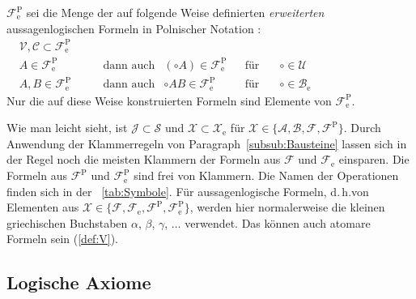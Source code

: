 \documentclass[english,ngerman,parskip=half,headsepline,footsepline,
	fleqn,notitlepage]{scrreprt}
\makeatletter
\newcommand*{\ase}{_\mathrm{e}}%
\newcommand*{\asp}{^\mathrm{P}}%
\newcommand*{\aspe}{\asp\ase}%
\newcommand*{\asA}{\mathcal{A}}%
\newcommand*{\asB}{\mathcal{B}}%
\newcommand*{\asC}{\mathcal{C}}%
\newcommand*{\asF}{\mathcal{F}}%
\newcommand*{\asJ}{\mathcal{J}}%
\newcommand*{\asS}{\mathcal{S}}%
\newcommand*{\asU}{\mathcal{U}}%
\newcommand*{\asV}{\mathcal{V}}%
\newcommand*{\asX}{\mathcal{X}}%
\newcommand*{\asBe}{\asB\ase}%
\newcommand*{\asXe}{\asX\ase}%
\newcommand*{\asFe}{\asF\ase}%
\newcommand*{\asFp}{\asF\asp}%
\newcommand*{\asFep}{\asF\aspe}%
\newcommand*{\formulatoleft}{&&&&&&&&&&}%
\newcommand*{\subsubsectionname}{Paragraph}
\newcommand*{\textdh}{d.\@\,h.\@ }
\makeatother
\begin{document}
	$\asFep$ sei die Menge der auf folgende Weise definierten
	\emph{erweiterten} aussagenlogischen Formeln in Polnischer Notation%
	:
	\begin{align}
		\asV, \asC \subset \asFep \\
		A              \in \asFep & \quad \quad \textrm{dann auch} &
		(\circ A)      \in \asFep & & \textrm{für} \quad & \circ \in \asU  \\
		A, B           \in \asFep & \quad \quad \textrm{dann auch} &
		\circ A B      \in \asFep & & \textrm{für} \quad & \circ \in \asBe
		\formulatoleft
	\end{align}
	Nur die auf diese Weise konstruierten Formeln sind Elemente von $\asFep$.

	Wie man leicht sieht,
	ist $ \asJ \subset \asS $ und $ \asX \subset \asXe $
	für $ \asX\in\{ \asA, \asB, \asF, \asFp \} $.
	Durch Anwendung der Klammerregeln von
	\subsubsectionname~\vref{subsub:Bausteine}
	lassen sich in der Regel noch die meisten Klammern
	der Formeln aus $\asF$ und $\asFe$ einsparen.
	Die Formeln aus $\asFp$ und $\asFep$ sind frei von Klammern.
	Die Namen der Operationen finden sich in der \tablename~\vref{tab:Symbole}.
	Für aussagenlogische Formeln,
	\textdh von Elementen aus $\asX\in\{ \asF, \asFe, \asFp, \asFep \}$,
	werden hier normalerweise die kleinen griechischen Buchstaben
	$\alpha$, $\beta$, $\gamma$, $\dots$ verwendet.
	Das können auch atomare Formeln sein (\seename \eqref{def:V}).

	\subsection{Logische Axiome}%
	\label{sub:logAxiome}
\end{document}

